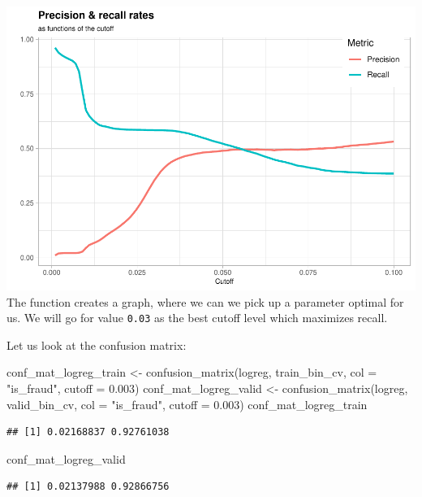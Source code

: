 \documentclass[
]{report}
\newenvironment{Shaded}{\begin{snugshade}}{\end{snugshade}}
\newcommand{\AttributeTok}[1]{\textcolor[rgb]{0.77,0.63,0.00}{#1}}
\newcommand{\FloatTok}[1]{\textcolor[rgb]{0.00,0.00,0.81}{#1}}
\newcommand{\FunctionTok}[1]{\textcolor[rgb]{0.00,0.00,0.00}{#1}}
\newcommand{\NormalTok}[1]{#1}
\newcommand{\OtherTok}[1]{\textcolor[rgb]{0.56,0.35,0.01}{#1}}
\newcommand{\StringTok}[1]{\textcolor[rgb]{0.31,0.60,0.02}{#1}}
\begin{document}
\includegraphics{credit_card_fraud_detection_files/figure-latex/cutoff_lvl-1.pdf}
The function creates a graph, where we can we pick up a parameter
optimal for us. We will go for value \texttt{0.03} as the best cutoff
level which maximizes recall.

Let us look at the confusion matrix:

\begin{Shaded}
\begin{Highlighting}[]
\NormalTok{conf\_mat\_logreg\_train }\OtherTok{\textless{}{-}} 
  \FunctionTok{confusion\_matrix}\NormalTok{(logreg, train\_bin\_cv, }\AttributeTok{col =} \StringTok{"is\_fraud"}\NormalTok{, }\AttributeTok{cutoff =} \FloatTok{0.003}\NormalTok{)}
\NormalTok{conf\_mat\_logreg\_valid }\OtherTok{\textless{}{-}} 
  \FunctionTok{confusion\_matrix}\NormalTok{(logreg, valid\_bin\_cv, }\AttributeTok{col =} \StringTok{"is\_fraud"}\NormalTok{, }\AttributeTok{cutoff =} \FloatTok{0.003}\NormalTok{)}
\NormalTok{conf\_mat\_logreg\_train}
\end{Highlighting}
\end{Shaded}

\begin{verbatim}
## [1] 0.02168837 0.92761038
\end{verbatim}

\begin{Shaded}
\begin{Highlighting}[]
\NormalTok{conf\_mat\_logreg\_valid}
\end{Highlighting}
\end{Shaded}

\begin{verbatim}
## [1] 0.02137988 0.92866756
\end{verbatim}
\end{document}
